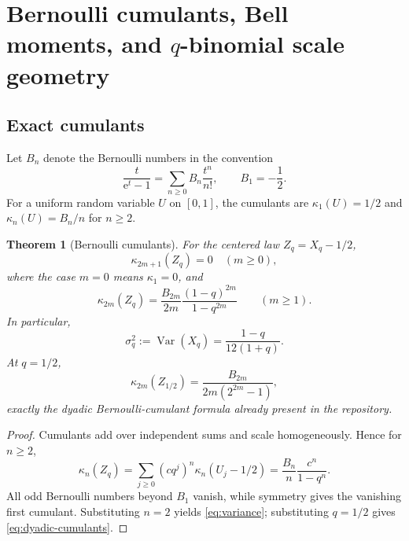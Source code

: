 \documentclass[11pt,oneside]{article}
\newtheorem{theorem}{Theorem}[section]
\theoremstyle{definition}
\theoremstyle{remark}
\newcommand{\Var}{\operatorname{Var}}
\newcommand{\e}{\mathrm e}
\begin{document}
\section{Bernoulli cumulants, Bell moments, and \texorpdfstring{$q$}{q}-binomial scale geometry}
\label{sec:bell}

\subsection{Exact cumulants}

Let $B_n$ denote the Bernoulli numbers in the convention
\[
 \frac{t}{\e^t-1}=\sum_{n\ge0}B_n\frac{t^n}{n!},
 \qquad B_1=-\frac12.
\]
For a uniform random variable $U$ on $[0,1]$, the cumulants are
$\kappa_1(U)=1/2$ and $\kappa_n(U)=B_n/n$ for $n\ge2$.

\begin{theorem}[Bernoulli cumulants]
\label{thm:cumulants}
For the centered law $Z_q=X_q-1/2$,
\begin{equation}
 \kappa_{2m+1}(Z_q)=0\quad(m\ge0),                            \label{eq:odd-cumulants}
\end{equation}
where the case $m=0$ means $\kappa_1=0$, and
\begin{equation}
 \boxed{\displaystyle
 \kappa_{2m}(Z_q)
 =\frac{B_{2m}}{2m}\frac{(1-q)^{2m}}{1-q^{2m}}}
 \qquad(m\ge1).                                             \label{eq:q-cumulants}
\end{equation}
In particular,
\begin{equation}
 \sigma_q^2:=\Var(X_q)=\frac{1-q}{12(1+q)}.                  \label{eq:variance}
\end{equation}
At $q=1/2$,
\begin{equation}
 \kappa_{2m}(Z_{1/2})
 =\frac{B_{2m}}{2m(2^{2m}-1)},                               \label{eq:dyadic-cumulants}
\end{equation}
exactly the dyadic Bernoulli-cumulant formula already present in the repository.
\end{theorem}

\begin{proof}
Cumulants add over independent sums and scale homogeneously.  Hence for $n\ge2$,
\[
 \kappa_n(Z_q)
 =\sum_{j\ge0}(cq^j)^n\kappa_n(U_j-1/2)
 =\frac{B_n}{n}\frac{c^n}{1-q^n}.
\]
All odd Bernoulli numbers beyond $B_1$ vanish, while symmetry gives the vanishing first
cumulant.  Substituting $n=2$ yields \eqref{eq:variance}; substituting $q=1/2$ gives
\eqref{eq:dyadic-cumulants}.
\end{proof}
\end{document}
